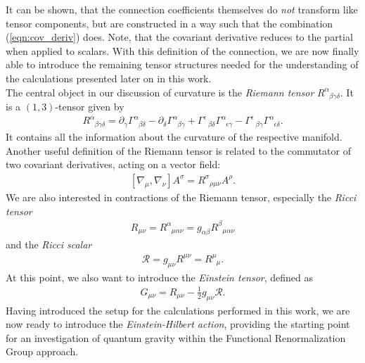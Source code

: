 It can be shown, that the connection coefficients themselves do \textit{not} transform like tensor components, but are constructed in a way such that the combination (\ref{eqn:cov_deriv}) does. Note, that the covariant derivative reduces to the partial when applied to scalars. With this definition of the connection, we are now finally able to introduce the remaining tensor structures needed for the understanding of the calculations presented later on in this work. \\
The central object in our discussion of curvature is the \textit{Riemann tensor} $R_{\phantom{\alpha}\beta \gamma \delta}^{\alpha}$. It is a $(1, 3)$-tensor given by
\begin{align} 
	R_{\phantom{\alpha}\beta \gamma \delta}^{\alpha}=\partial_{\gamma} \Gamma_{\phantom{\alpha}\beta \delta}^{\alpha}-\partial_{\delta} \Gamma_{\phantom{\alpha}\beta \gamma}^{\alpha}+\Gamma_{\phantom{\alpha}\beta \delta}^{\epsilon} \Gamma_{\phantom{\alpha}\epsilon \gamma}^{\alpha}-\Gamma_{\phantom{\alpha}\beta \gamma}^{\epsilon} \Gamma_{\phantom{\alpha}\epsilon \delta}^{\alpha}.
\end{align}
It contains all the information about the curvature of the respective manifold. Another useful definition of the Riemann tensor is related to the commutator of two covariant derivatives, acting on a vector field:
\begin{align}
	\left[\nabla_{\mu}, \nabla_{\nu}\right] A^{\sigma}=R_{\phantom{\alpha}\rho \mu \nu}^{\sigma} A^{\rho}. \label{eqn:Riemann}
\end{align}
We are also interested in contractions of the Riemann tensor, especially the \textit{Ricci tensor} 
\begin{align}
	R_{\mu\nu} = R^{\alpha}_{\phantom{\alpha}\mu\alpha\nu} = g_{\alpha\beta} R^{\beta}_{\phantom{\alpha}\mu\alpha\nu}
\end{align}
and the \textit{Ricci scalar} 
\begin{align}
\mathcal{R} = g_{\mu\nu}R^{\mu\nu} = R^{\mu}_{\phantom{\mu}\mu}.
\end{align}
At this point, we also want to introduce the \textit{Einstein tensor}, defined as
\begin{align}
	 G_{\mu\nu} = R_{\mu\nu} - \frac{1}{2}g_{\mu\nu}\mathcal{R}.
\end{align}
Having introduced the setup for the calculations performed in this work, we are now ready to introduce the \textit{Einstein-Hilbert action}, providing the starting point for an investigation of quantum gravity within the Functional Renormalization Group approach. 
